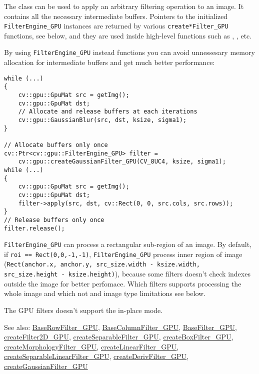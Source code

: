 The class can be used to apply an arbitrary filtering operation to an image. It contains all the necessary intermediate buffers. Pointers to the initialized \texttt{FilterEngine\_GPU} instances are returned by various \texttt{create*Filter\_GPU} functions, see below, and they are used inside high-level functions such as , ,  etc.

By using \texttt{FilterEngine\_GPU} instead functions you can avoid unnessesary memory allocation for intermediate buffers and get much better performance:

\begin{lstlisting}
while (...)
{
    cv::gpu::GpuMat src = getImg();
    cv::gpu::GpuMat dst;
    // Allocate and release buffers at each iterations
    cv::gpu::GaussianBlur(src, dst, ksize, sigma1);
}

// Allocate buffers only once
cv::Ptr<cv::gpu::FilterEngine_GPU> filter = 
    cv::gpu::createGaussianFilter_GPU(CV_8UC4, ksize, sigma1);
while (...)
{
    cv::gpu::GpuMat src = getImg();
    cv::gpu::GpuMat dst;
    filter->apply(src, dst, cv::Rect(0, 0, src.cols, src.rows));
}
// Release buffers only once
filter.release();
\end{lstlisting}

\texttt{FilterEngine\_GPU} can process a rectangular sub-region of an image. By default, if \texttt{roi == Rect(0,0,-1,-1)}, \texttt{FilterEngine\_GPU} process inner region of image (\texttt{Rect(anchor.x, anchor.y, src\_size.width - ksize.width, src\_size.height - ksize.height)}), because some filters doesn't check indexes outside the image for better perfomace. Which filters supports processing the whole image and which not and image type limitations see below.

The GPU filters doesn't support the in-place mode.

See also: \hyperref[class.gpu.BaseRowFilter]{BaseRowFilter\_GPU}, \hyperref[class.gpu.BaseColumnFilter]{BaseColumnFilter\_GPU}, \hyperref[class.gpu.BaseFilter]{BaseFilter\_GPU}, \hyperref[cppfunc.gpu.createFilter2D]{createFilter2D\_GPU}, \hyperref[cppfunc.gpu.createSeparableFilter]{createSeparableFilter\_GPU}, \hyperref[cppfunc.gpu.createBoxFilter]{createBoxFilter\_GPU}, \hyperref[cppfunc.gpu.createMorphologyFilter]{createMorphologyFilter\_GPU}, \hyperref[cppfunc.gpu.createLinearFilter]{createLinearFilter\_GPU}, \hyperref[cppfunc.gpu.createSeparableLinearFilter]{createSeparableLinearFilter\_GPU}, \hyperref[cppfunc.gpu.createDerivFilter]{createDerivFilter\_GPU}, \hyperref[cppfunc.gpu.createGaussianFilter]{createGaussianFilter\_GPU}

